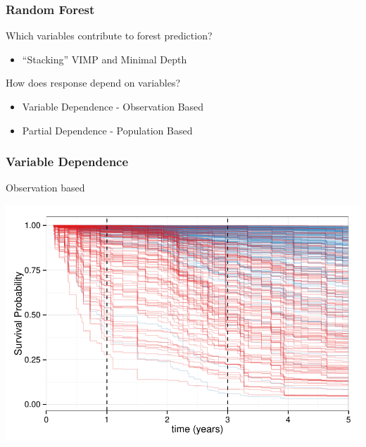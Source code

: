\documentclass[xcolor=svgnames]{beamer}\usepackage[]{graphicx}\usepackage[]{color}
\newenvironment{knitrout}{}{} %
\begin{document}
\begin{frame}
\frametitle{Random Forest}
Which variables contribute to forest prediction?
\begin{itemize}
\item  ``Stacking'' VIMP and Minimal Depth
\end{itemize}

How does response depend on variables?
\begin{itemize}
\item  Variable Dependence - Observation Based
\item  Partial Dependence - Population Based
\end{itemize}
\end{frame}

\begin{frame}
\frametitle{Variable Dependence}

Observation based

\begin{knitrout}\footnotesize
{}\color{fgcolor}

{\centering \includegraphics[width=.9\linewidth]{figures/rfsrc-plot3Mnth-pbc-1} 

}



\end{knitrout}

\end{frame}
\end{document}
